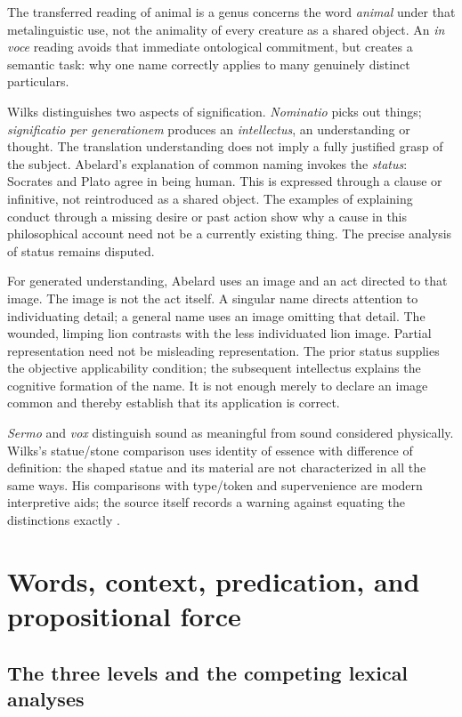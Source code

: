 The transferred reading of animal is a genus concerns the word
\emph{animal} under that metalinguistic use, not the animality of
every creature as a shared object. An \emph{in voce} reading avoids
that immediate ontological commitment, but creates a semantic task:
why one name correctly applies to many genuinely distinct particulars.

Wilks distinguishes two aspects of signification.
\emph{Nominatio} picks out things; \emph{significatio per generationem}
produces an \emph{intellectus}, an understanding or thought.
The translation understanding does not imply a fully justified
grasp of the subject. Abelard's explanation of common naming invokes
the \emph{status}: Socrates and Plato agree in being human.
This is expressed through a clause or infinitive, not reintroduced
as a shared object. The examples of explaining conduct through
a missing desire or past action show why a cause in this philosophical
account need not be a currently existing thing.
The precise analysis of status remains disputed.

For generated understanding, Abelard uses an image and an act directed
to that image. The image is not the act itself.
A singular name directs attention to individuating detail; a general
name uses an image omitting that detail.
The wounded, limping lion contrasts with the less individuated lion image.
Partial representation need not be misleading representation.
The prior status supplies the objective applicability condition;
the subsequent intellectus explains the cognitive formation of the name.
It is not enough merely to declare an image common and thereby
establish that its application is correct.

\emph{Sermo} and \emph{vox} distinguish sound as meaningful from sound
considered physically. Wilks's statue/stone comparison uses identity
of essence with difference of definition: the shaped statue and its
material are not characterized in all the same ways.
His comparisons with type/token and supervenience are modern interpretive
aids; the source itself records a warning against equating the distinctions
exactly \cite[pp.~85--92]{Wilks2007FordhamAbelard}.

\section{Words, context, predication, and propositional force}
\label{sec:p13-abelard-lexical}

\subsection{The three levels and the competing lexical analyses}

